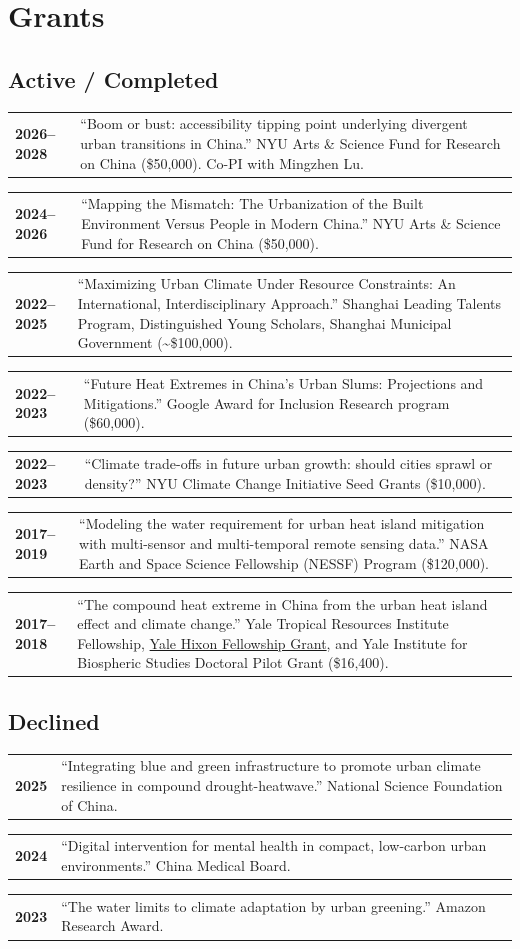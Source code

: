 \documentclass[11pt,letterpaper]{article}
\makeatletter
\newcommand{\cventry}[2]{%
  \noindent\begin{tabularx}{\textwidth}{@{}l X@{}}
    \textbf{#1} & #2
  \end{tabularx}\vspace{2pt}%
}
\makeatother
\begin{document}
\section{Grants}

\subsection{Active / Completed}
\cventry{2026--2028}{``Boom or bust: accessibility tipping point underlying divergent urban transitions in China.'' NYU Arts \& Science Fund for Research on China (\$50,000). Co-PI with Mingzhen Lu.}
\cventry{2024--2026}{``Mapping the Mismatch: The Urbanization of the Built Environment Versus People in Modern China.'' NYU Arts \& Science Fund for Research on China (\$50,000).}
\cventry{2022--2025}{``Maximizing Urban Climate Under Resource Constraints: An International, Interdisciplinary Approach.'' Shanghai Leading Talents Program, Distinguished Young Scholars, Shanghai Municipal Government (\textasciitilde\$100,000).}
\cventry{2022--2023}{``Future Heat Extremes in China's Urban Slums: Projections and Mitigations.'' Google Award for Inclusion Research program (\$60,000).}
\cventry{2022--2023}{``Climate trade-offs in future urban growth: should cities sprawl or density?'' NYU Climate Change Initiative Seed Grants (\$10,000).}
\cventry{2017--2019}{``Modeling the water requirement for urban heat island mitigation with multi-sensor and multi-temporal remote sensing data.'' NASA Earth and Space Science Fellowship (NESSF) Program (\$120,000).}
\cventry{2017--2018}{``The compound heat extreme in China from the urban heat island effect and climate change.'' Yale Tropical Resources Institute Fellowship, \href{https://hixon.yale.edu/research/fellowship/fellows/kangning-ken-huang}{Yale Hixon Fellowship Grant}, and Yale Institute for Biospheric Studies Doctoral Pilot Grant (\$16,400).}

\subsection{Declined}
\cventry{2025}{``Integrating blue and green infrastructure to promote urban climate resilience in compound drought-heatwave.'' National Science Foundation of China.}
\cventry{2024}{``Digital intervention for mental health in compact, low-carbon urban environments.'' China Medical Board.}
\cventry{2023}{``The water limits to climate adaptation by urban greening.'' Amazon Research Award.}
\end{document}
